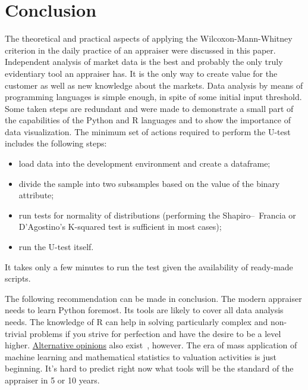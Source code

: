 \documentclass[]{scrreprt}
\begin{document}
\chapter{Conclusion}
The theoretical and practical aspects of applying the Wilcoxon-Mann-Whitney criterion in the daily practice of an appraiser were discussed in this paper. Independent analysis of market data is the best and probably the only truly evidentiary tool an appraiser has. It is the only way to create value for the customer as well as new knowledge about the markets. Data analysis by means of programming languages is simple enough, in spite of some initial input threshold. Some taken steps are redundant and were made to demonstrate a small part of the capabilities of the Python and R languages and to show the importance of data visualization. The minimum set of actions required to perform the U-test includes the following steps:
\begin{itemize}
	\item load data into the development environment and create a dataframe;
	\item divide the sample into two subsamples based on the value of the binary attribute;
	\item run tests for normality of distributions (performing the Shapiro--~Francia or D'Agostino's K-squared test is sufficient in most cases);
	\item run the U-test itself.
\end{itemize}
It takes only a few minutes to run the test given the availability of ready-made scripts.

The following recommendation can be made in conclusion. The modern appraiser needs to learn Python foremost. Its tools are likely to cover all data analysis needs. The knowledge of R can help in solving particularly complex and non-trivial problems if you strive for perfection and have the desire to be a level higher. \href{https://habr.com/ru/post/670250/}{Alternative opinions} also exist~\cite{Habr:Python-or-R}, however. The era of mass application of machine learning and mathematical statistics to valuation activities is just beginning. It's hard to predict right now what tools will be the standard of the appraiser in 5 or 10 years.
%
\clearpage
%
\nocite{Essential-Statistical-Inference}
\nocite{AUC-optimization}
\nocite{Mann-Whitney-1947}
\nocite{Optimizing-classifier-performance}
\nocite{ROC-R-1}
\nocite{ROC-AUC-1}
\nocite{ROC-AUC-meets-U-R-1}

\printbibliography
\end{document}
